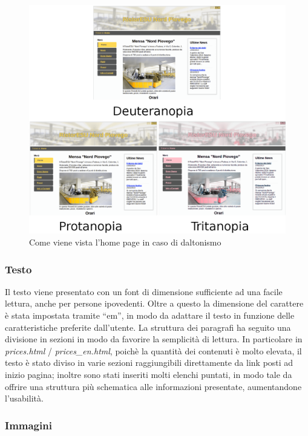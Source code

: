 \documentclass[10pt,a4paper,onecolumn]{article}
\begin{document}
\begin{figure}[h]
\centering
\includegraphics[scale=0.25]{home_colors}
\caption{Come viene vista l'home page in caso di daltonismo}
\label{colors}
\end{figure}

\subsubsection{Testo}

Il testo viene presentato con un font di dimensione sufficiente ad una facile lettura, anche per persone ipovedenti. Oltre a questo la dimensione del carattere è stata impostata tramite ``em'', in modo da adattare il testo in funzione delle caratteristiche preferite dall'utente.
La struttura dei paragrafi ha seguito una divisione in sezioni in modo da favorire la semplicità di lettura. In particolare in \textit{prices.html} / \textit{prices\_en.html}, poichè la quantità dei contenuti è molto elevata, il testo è stato diviso in varie sezioni raggiungibili direttamente da link posti ad inizio pagina; inoltre sono stati inseriti molti elenchi puntati, in modo tale da offrire una struttura più schematica alle informazioni presentate, aumentandone l'usabilità.

\subsubsection{Immagini}
\end{document}
